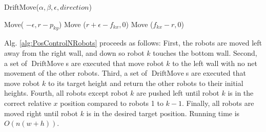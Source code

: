 \begin{algorithm}
\caption{ {\sc DriftMove}($\alpha,\beta,\epsilon,direction$)}\label{alg:DriftMove}
\begin{algorithmic}[1]
\State Move( $-\epsilon, r-p_{ky}$) %
\State Move ($r+\epsilon-f_{kx}, 0$)  %
\State Move ($f_{kx}-r, 0$)  

\end{algorithmic}
\end{algorithm}


Alg. \ref{alg:PosControlNRobots} proceeds as follows:  
First, the robots are moved left away from the right wall, and down so robot $k$ touches the bottom wall.
Second, a set of $\operatorname{DriftMove}$s are executed that move robot $k$ to the left wall with no net movement of the other robots.
Third, a set of $\operatorname{DriftMove}$s are executed that  move robot $k$ to its target height and return the other robots to their initial heights. 
Fourth, all robots except robot $k$ are pushed left until robot $k$ is in the correct relative $x$ position compared to robots 1 to $k-1$.
Finally, all robots are moved right until robot $k$ is in the desired target position. Running time is $O(n(w+h))$.



